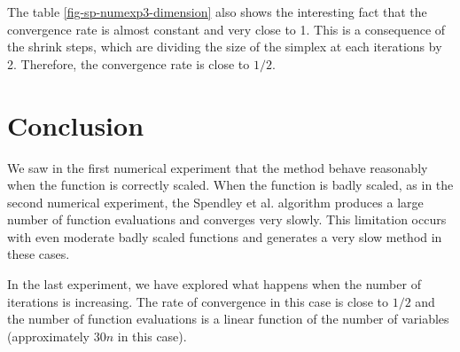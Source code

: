 The table \ref{fig-sp-numexp3-dimension} also shows the interesting 
fact that the convergence rate is almost constant and 
very close to 1. This is a consequence of the shrink steps,
which are dividing the size of the simplex at each iterations by 2.
Therefore, the convergence rate is close to $1/2$.

\section{Conclusion}

We saw in the first numerical experiment that the method 
behave reasonably when the function is correctly scaled.
When the function is badly scaled, as in the second numerical 
experiment, the Spendley et al. algorithm produces a large 
number of function evaluations and converges very slowly.
This limitation occurs with even moderate badly scaled 
functions and generates a very slow method in these 
cases.

In the last experiment, we have explored what happens when the number of 
iterations is increasing. The rate of convergence in this case is close to $1/2$
and the number of function evaluations is a linear function of the number 
of variables (approximately $30n$ in this case).

